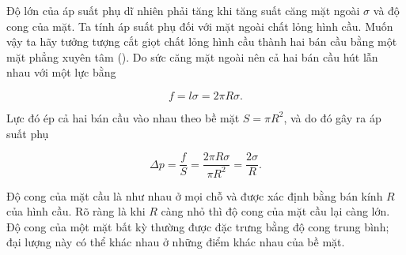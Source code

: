 
Độ lớn của áp suất phụ dĩ nhiên phải tăng khi tăng suất căng mặt ngoài $\sigma$ và độ cong của mặt. Ta tính áp suất phụ đối với mặt ngoài chất lỏng hình cầu. Muốn vậy ta hãy tưởng tượng cắt giọt chất lỏng hình cầu thành hai bán cầu bằng một mặt phẳng xuyên tâm (). Do sức căng mặt ngoài nên cả hai bán cầu hút lẫn nhau với một lực bằng

\begin{equation*}
	f = l\sigma = 2\pi R\sigma.
\end{equation*}

\noindent

Lực đó ép cả hai bán cầu vào nhau theo bề mặt $S=\pi R^2$, và do đó gây ra áp suất phụ

\begin{equation}\label{eq:14_1}
	\Delta p = \frac{f}{S} = \frac{2\pi R\sigma}{\pi R^2} = \frac{2\sigma}{R}.
\end{equation}


Độ cong của mặt cầu là như nhau ở mọi chỗ và được xác định bằng bán kính $R$ của hình cầu. Rõ ràng là khi $R$ càng nhỏ thì độ cong của mặt cầu lại càng lớn. Độ cong của một mặt bất kỳ thường được đặc trưng bằng độ cong trung bình; đại lượng này có thể khác nhau ở những điểm khác nhau của bề mặt.


